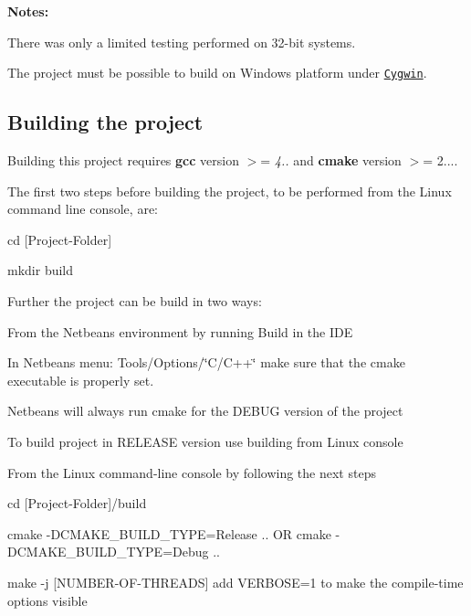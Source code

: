 {\bfseries Notes\+:}


\begin{DoxyEnumerate}
\item There was only a limited testing performed on 32-\/bit systems.
\item The project must be possible to build on Windows platform under \href{https://www.cygwin.com/}{\tt Cygwin}.
\end{DoxyEnumerate}

\subsection*{Building the project}

Building this project requires {\bfseries gcc} version $>$= {\itshape 4..} and {\bfseries cmake} version $>$= 2....

The first two steps before building the project, to be performed from the Linux command line console, are\+:


\begin{DoxyItemize}
\item {\ttfamily cd \mbox{[}Project-\/\+Folder\mbox{]}}
\item {\ttfamily mkdir build}
\end{DoxyItemize}

Further the project can be build in two ways\+:


\begin{DoxyItemize}
\item From the Netbeans environment by running Build in the I\+D\+E
\begin{DoxyItemize}
\item In Netbeans menu\+: {\ttfamily Tools/\+Options/\char`\"{}\+C/\+C++\char`\"{}} make sure that the cmake executable is properly set.
\item Netbeans will always run cmake for the D\+E\+B\+U\+G version of the project
\item To build project in R\+E\+L\+E\+A\+S\+E version use building from Linux console
\end{DoxyItemize}
\item From the Linux command-\/line console by following the next steps
\begin{DoxyItemize}
\item {\ttfamily cd \mbox{[}Project-\/\+Folder\mbox{]}/build}
\item {\ttfamily cmake -\/\+D\+C\+M\+A\+K\+E\+\_\+\+B\+U\+I\+L\+D\+\_\+\+T\+Y\+P\+E=Release ..} O\+R {\ttfamily cmake -\/\+D\+C\+M\+A\+K\+E\+\_\+\+B\+U\+I\+L\+D\+\_\+\+T\+Y\+P\+E=Debug ..}
\item {\ttfamily make -\/j \mbox{[}N\+U\+M\+B\+E\+R-\/\+O\+F-\/\+T\+H\+R\+E\+A\+D\+S\mbox{]}} add {\ttfamily V\+E\+R\+B\+O\+S\+E=1} to make the compile-\/time options visible
\end{DoxyItemize}
\end{DoxyItemize}

